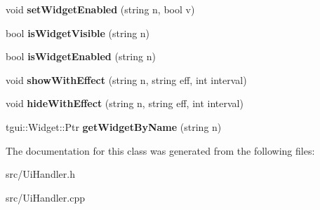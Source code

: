 \begin{DoxyCompactItemize}
\item 
\mbox{\label{classdarksun_1_1_u_i_wrangler_a73789ad0c503370a507ddd2970834d7d}} 
void {\bfseries set\+Widget\+Enabled} (string n, bool v)
\item 
\mbox{\label{classdarksun_1_1_u_i_wrangler_ae59dd739bce220df508421bcced163c7}} 
bool {\bfseries is\+Widget\+Visible} (string n)
\item 
\mbox{\label{classdarksun_1_1_u_i_wrangler_aecfce535575dc1870c6a4f815031795e}} 
bool {\bfseries is\+Widget\+Enabled} (string n)
\item 
\mbox{\label{classdarksun_1_1_u_i_wrangler_af6bda377eaea067bfc00c3919a7ce5a0}} 
void {\bfseries show\+With\+Effect} (string n, string eff, int interval)
\item 
\mbox{\label{classdarksun_1_1_u_i_wrangler_a042159312a1ca02ba6749e7e5a8c0921}} 
void {\bfseries hide\+With\+Effect} (string n, string eff, int interval)
\item 
\mbox{\label{classdarksun_1_1_u_i_wrangler_ac6fe258b9b1c454782bd12865359a632}} 
tgui\+::\+Widget\+::\+Ptr {\bfseries get\+Widget\+By\+Name} (string n)
\end{DoxyCompactItemize}


The documentation for this class was generated from the following files\+:\begin{DoxyCompactItemize}
\item 
src/Ui\+Handler.\+h\item 
src/Ui\+Handler.\+cpp\end{DoxyCompactItemize}
